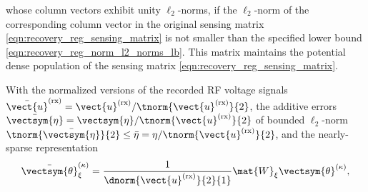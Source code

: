 whose
column vectors exhibit
unity $\ell_{2}$-norms, if
the $\ell_{2}$-norm of
the corresponding column vector in
the original sensing matrix
\eqref{eqn:recovery_reg_sensing_matrix} is
not smaller than
the specified lower bound
\eqref{eqn:recovery_reg_norm_l2_norms_lb}.
This matrix maintains
the potential dense population of
the sensing matrix
\eqref{eqn:recovery_reg_sensing_matrix}.

With
the normalized versions of
the recorded \ac{RF} voltage signals
$\bar{\vect{u}}^{(\text{rx})} = \vect{u}^{(\text{rx})} / \tnorm{ \vect{u}^{(\text{rx})} }{2}$,
the additive errors
$\bar{\vectsym{\eta}} = \vectsym{\eta} / \tnorm{ \vect{u}^{(\text{rx})} }{2}$ of
bounded $\ell_{2}$-norm
$\tnorm{ \bar{\vectsym{\eta}} }{2} \leq \bar{\eta} = \eta / \tnorm{ \vect{u}^{(\text{rx})} }{2}$, and
the nearly-sparse representation
\begin{equation}
  \bar{\vectsym{\theta}}_{\xi}^{(\kappa)}
  =
  \frac{ 1 }{ \dnorm{ \vect{u}^{(\text{rx})} }{2}{1} }
  \mat{W}_{\xi}
  \vectsym{\theta}^{(\kappa)},
 \label{eqn:recon_reg_norm_trans_coef}
\end{equation}

